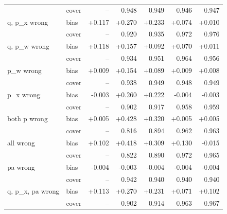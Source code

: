 \begin{tabular}{@{}llrrrrr@{}}
 & cover & -- & 0.948 & 0.949 & 0.946 & 0.947\\
q, p_x wrong & bias & +0.117 & +0.270 & +0.233 & +0.074 & +0.010\\
 & cover & -- & 0.920 & 0.935 & 0.972 & 0.976\\
q, p_w wrong & bias & +0.118 & +0.157 & +0.092 & +0.070 & +0.011\\
 & cover & -- & 0.934 & 0.951 & 0.964 & 0.956\\
p_w wrong & bias & +0.009 & +0.154 & +0.089 & +0.009 & +0.008\\
 & cover & -- & 0.938 & 0.949 & 0.948 & 0.949\\
p_x wrong & bias & -0.003 & +0.260 & +0.222 & -0.004 & -0.003\\
 & cover & -- & 0.902 & 0.917 & 0.958 & 0.959\\
both p wrong & bias & +0.005 & +0.428 & +0.320 & +0.005 & +0.005\\
 & cover & -- & 0.816 & 0.894 & 0.962 & 0.963\\
all wrong & bias & +0.102 & +0.418 & +0.309 & +0.130 & -0.015\\
 & cover & -- & 0.822 & 0.890 & 0.972 & 0.965\\
pa wrong & bias & -0.004 & -0.003 & -0.004 & -0.004 & -0.004\\
 & cover & -- & 0.942 & 0.940 & 0.940 & 0.940\\
q, p_x, pa wrong & bias & +0.113 & +0.270 & +0.231 & +0.071 & +0.102\\
 & cover & -- & 0.902 & 0.914 & 0.963 & 0.967\\
\bottomrule
\end{tabular}